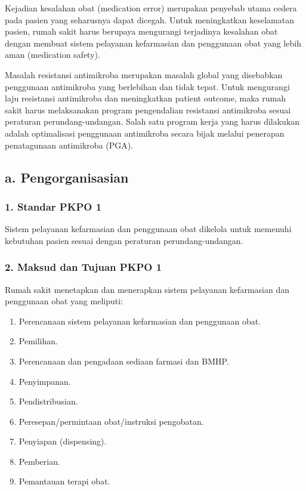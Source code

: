 \documentclass[
]{book}
\providecommand{\tightlist}{%
  \setlength{\itemsep}{0pt}\setlength{\parskip}{0pt}}
\begin{document}
Kejadian kesalahan obat (medication error) merupakan penyebab utama cedera pada pasien yang seharusnya dapat dicegah. Untuk meningkatkan keselamatan pasien, rumah sakit harus berupaya mengurangi terjadinya kesalahan obat dengan membuat sistem pelayanan kefarmasian dan penggunaan obat yang lebih aman (medication safety).

Masalah resistansi antimikroba merupakan masalah global yang disebabkan penggunaan antimikroba yang berlebihan dan tidak tepat. Untuk mengurangi laju resistansi antimikroba dan meningkatkan patient outcome, maka rumah sakit harus melaksanakan program pengendalian resistansi antimikroba sesuai peraturan perundang-undangan. Salah satu program kerja yang harus dilakukan adalah optimalisasi penggunaan antimikroba secara bijak melalui penerapan penatagunaan antimikroba (PGA).

\hypertarget{a.-pengorganisasian}{%
\subsection*{a. Pengorganisasian}\label{a.-pengorganisasian}}

\hypertarget{standar-pkpo-1}{%
\subsubsection*{1. Standar PKPO 1}\label{standar-pkpo-1}}

Sistem pelayanan kefarmasian dan penggunaan obat dikelola untuk memenuhi kebutuhan pasien sesuai dengan peraturan perundang-undangan.

\hypertarget{maksud-dan-tujuan-pkpo-1}{%
\subsubsection*{2. Maksud dan Tujuan PKPO 1}\label{maksud-dan-tujuan-pkpo-1}}

Rumah sakit menetapkan dan menerapkan sistem pelayanan kefarmasian dan penggunaan obat yang meliputi:

\begin{enumerate}
\def\labelenumi{\alph{enumi}.}
\tightlist
\item
  Perencanaan sistem pelayanan kefarmasian dan penggunaan obat.
\item
  Pemilihan.
\item
  Perencanaan dan pengadaan sediaan farmasi dan BMHP.
\item
  Penyimpanan.
\item
  Pendistribusian.
\item
  Peresepan/permintaan obat/instruksi pengobatan.
\item
  Penyiapan (dispensing).
\item
  Pemberian.
\item
  Pemantauan terapi obat.
\end{enumerate}
\end{document}
